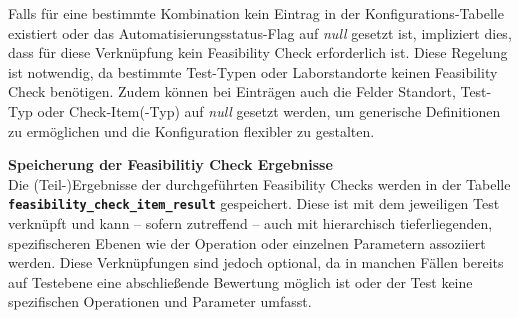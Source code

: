 \begin{table}[htbp]
    \centering
    \caption{Spalten der Feasibility Check Konfigurations-Tabelle: \texttt{ctlg\_\-feasibility\_\-config}}
    \footnotesize
    \renewcommand{\arraystretch}{1.2}
    \label{tab:config-fields}
\end{table}

Falls für eine bestimmte Kombination kein Eintrag in der Konfigurations-Tabelle existiert oder das Automatisierungsstatus-Flag auf \textit{null} gesetzt ist, impliziert dies, dass für diese Verknüpfung kein Feasibility Check erforderlich ist. Diese Regelung ist notwendig, da bestimmte Test-Typen oder Laborstandorte keinen Feasibility Check benötigen. Zudem können bei Einträgen auch die Felder Standort, Test-Typ oder Check-Item(-Typ) auf \textit{null} gesetzt werden, um generische Definitionen zu ermöglichen und die Konfiguration flexibler zu gestalten.

\textbf{Speicherung der Feasibilitiy Check Ergebnisse} \\
Die (Teil-)Ergebnisse der durchgeführten Feasibility Checks werden in der Tabelle \textbf{\texttt{feasibility\_check\_item\_result}} gespeichert. Diese ist mit dem jeweiligen Test verknüpft und kann – sofern zutreffend – auch mit hierarchisch tieferliegenden, spezifischeren Ebenen wie der Operation oder einzelnen Parametern assoziiert werden. Diese Verknüpfungen sind jedoch optional, da in manchen Fällen bereits auf Test\-ebene eine abschließende Bewertung möglich ist oder der Test keine spezifischen Operationen und Parameter umfasst.

